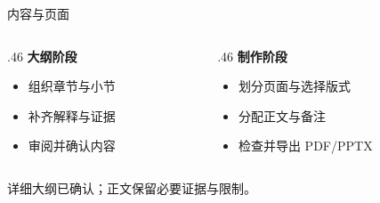 \begin{frame}{内容与页面}
  \begin{columns}[T,onlytextwidth]
    \begin{column}{.46\textwidth}
      \textbf{大纲阶段}
      \begin{itemize}
        \item 组织章节与小节
        \item 补齐解释与证据
        \item 审阅并确认内容
      \end{itemize}
    \end{column}
    \begin{column}{.46\textwidth}
      \textbf{制作阶段}
      \begin{itemize}
        \item 划分页面与选择版式
        \item 分配正文与备注
        \item 检查并导出 PDF/PPTX
      \end{itemize}
    \end{column}
  \end{columns}
  \begin{notebox}[制作前提]
    详细大纲已确认；正文保留必要证据与限制。
  \end{notebox}
\end{frame}
